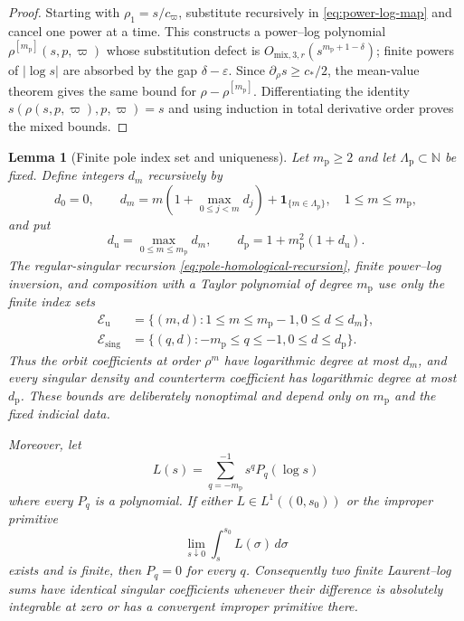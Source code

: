 \documentclass[11pt]{amsart}
\numberwithin{equation}{section}
\newtheorem{lemma}[theorem]{Lemma}
\theoremstyle{definition}
\theoremstyle{remark}
\begin{document}
\begin{proof}
Starting with $\rho_1=s/c_\varpi$, substitute recursively in
\eqref{eq:power-log-map} and cancel one power at a time.  This constructs a
power--log polynomial $\rho^{[m_{\mathrm p}]}(s,p,\varpi)$ whose
substitution defect is
$O_{\mathrm{mix},3,r}(s^{m_{\mathrm p}+1-\delta})$; finite powers of $|\log s|$ are
absorbed by the gap $\delta-\varepsilon$.  Since
$\partial_\rho s\ge c_*/2$, the mean-value theorem gives the same bound
for $\rho-\rho^{[m_{\mathrm p}]}$.  Differentiating the identity
$s(\rho(s,p,\varpi),p,\varpi)=s$ and using induction in total derivative
order proves the mixed bounds.
\end{proof}

\begin{lemma}[Finite pole index set and uniqueness]
\label{lem:pole-finite-index-uniqueness}
Let $m_{\mathrm p}\ge2$ and let $\Lambda_{\mathrm p}\subset\mathbb N$
be fixed.  Define integers $d_m$ recursively by
\begin{equation}\label{eq:pole-log-degree-recursion}
 d_0=0,\qquad
 d_m=m\left(1+\max_{0\le j<m}d_j\right)
       +\mathbf 1_{\{m\in\Lambda_{\mathrm p}\}},
 \quad 1\le m\le m_{\mathrm p},
\end{equation}
and put
\begin{equation}\label{eq:pole-log-degree-bound}
 d_{\mathrm u}=\max_{0\le m\le m_{\mathrm p}}d_m,
 \qquad
 d_{\mathrm p}=1+m_{\mathrm p}^2(1+d_{\mathrm u}).
\end{equation}
The regular-singular recursion
\eqref{eq:pole-homological-recursion}, finite power--log inversion, and
composition with a Taylor polynomial of degree $m_{\mathrm p}$ use only
the finite index sets
\begin{align}
 \mathcal E_{\mathrm u}
 &=\{(m,d):1\le m\le m_{\mathrm p}-1,
                    0\le d\le d_m\},
 \label{eq:pole-orbit-index-set}\\
 \mathcal E_{\mathrm{sing}}
 &=\{(q,d):-m_{\mathrm p}\le q\le-1,
                    0\le d\le d_{\mathrm p}\}.
 \label{eq:pole-density-index-set}
\end{align}
Thus the orbit coefficients at order $\rho^m$ have logarithmic degree at
most $d_m$, and every singular density and counterterm coefficient has
logarithmic degree at most $d_{\mathrm p}$.  These bounds are deliberately
nonoptimal and depend only on $m_{\mathrm p}$ and the fixed indicial data.

Moreover, let
\begin{equation}\label{eq:finite-laurent-log-sum}
 L(s)=\sum_{q=-m_{\mathrm p}}^{-1}s^qP_q(\log s)
\end{equation}
where every $P_q$ is a polynomial.  If either
$L\in L^1((0,s_0))$ or the improper primitive
\begin{equation}\label{eq:finite-laurent-log-primitive-condition}
 \lim_{s\downarrow0}\int_s^{s_0}L(\sigma)\,d\sigma
\end{equation}
exists and is finite, then $P_q=0$ for every $q$.  Consequently two finite
Laurent--log sums have identical singular coefficients whenever their
difference is absolutely integrable at zero or has a convergent improper
primitive there.
\end{lemma}
\end{document}
